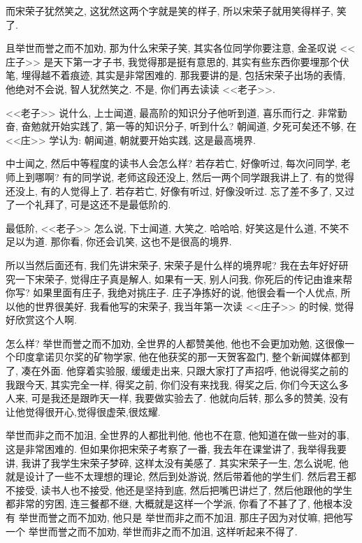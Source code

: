 \documentclass[11pt]{article}
\begin{document}
{\color{blue} 而宋荣子犹然笑之}, 这犹然这两个字就是笑的样子, 所以宋荣子就用笑得样子, 笑了. 


{\color{blue} 且举世而誉之而不加劝}, 那为什么宋荣子笑, 其实各位同学你要注意, 金圣叹说 <<庄子>> 是天下第一才子书, 我觉得那是挺有意思的, 其实有些东西你要埋那个伏笔, 埋得越不着痕迹, 其实是非常困难的. 那我要讲的是, 包括宋荣子出场的表情, 他绝对不会说, 智人犹然笑之. 不是, 你们再去读读 <<老子>>. 

<<老子>> 说什么, 上士闻道, 最高阶的知识分子他听到道, 喜乐而行之. 非常勤奋, 奋勉就开始实践了, 第一等的知识分子, 听到什么? 朝闻道, 夕死可矣还不够, 在 <<庄>> 学认为: 朝闻道, 朝就要开始实践, 这是最高境界. 

中士闻之, 然后中等程度的读书人会怎么样? 若存若亡, 好像听过, 每次问同学, 老师上到哪啊? 有的同学说, 老师这段还没上, 然后一两个同学跟我讲上了. 有的觉得还没上, 有的人觉得上了. 若存若亡, 好像有听过, 好像没听过. 忘了差不多了, 又过了一个礼拜了, 可是这还不是最低阶的.

最低阶, <<老子>> 怎么说, 下士闻道, 大笑之. 哈哈哈, 好笑这是什么道, 不笑不足以为道. 那你看, 你还会讥笑, 这也不是很高的境界.

所以当然后面还有, 我们先讲宋荣子, 宋荣子是什么样的境界呢? 我在去年好好研究一下宋荣子, 觉得庄子真是解人, 如果有一天, 别人问我, 你死后的传记由谁来帮你写? 如果里面有庄子, 我绝对挑庄子. 庄子净拣好的说, 他很会看一个人优点, 所以他的世界很美好. 我看他写的宋荣子, 我当年第一次读 <<庄子>> 的时候, 觉得好欣赏这个人啊. 

怎么样? {\color{blue} 举世而誉之而不加劝}, 全世界的人都赞美他, 他也不会更加劝勉, 这很像一个印度拿诺贝尔奖的矿物学家, 他在他获奖的那一天贺客盈门, 整个新闻媒体都到了, 凑在外面. 他穿着实验服, 缓缓走出来, 只跟大家打了声招呼, 他说得奖之前的我跟今天, 其实完全一样, 得奖之前, 你们没有来找我, 得奖之后, 你们今天这么多人来, 可是我还是跟昨天一样, 我要做实验去了. 他就向后转, 那么多的赞美, 没有让他觉得很开心,觉得很虚荣,很炫耀.

{\color{blue} 举世而非之而不加沮}, 全世界的人都批判他, 他也不在意, 他知道在做一些对的事, 这是非常困难的. 但如果你把宋荣子考察了一番, 我去年在课堂讲了, 我举得我要讲, 我讲了我学生宋荣子梦碎, 这样太没有美感了. 其实宋荣子一生, 怎么说呢, 他就是设计了一些不太理想的理论, 然后到处游说, 然后带着他的学生们. 然后君王都不接受, 读书人也不接受, 他还是坚持到底, 然后把嘴巴讲烂了, 然后他跟他的学生都非常的穷困, 连三餐都不继, 大概就是这样一个学派, 你看了不甚了了, 他根本没有{\color{blue} 举世而誉之而不加劝}, 他只是{\color{blue} 举世而非之而不加沮}. 那庄子因为对仗嘛, 把他写一个 {\color{blue} 举世而誉之而不加劝, 举世而非之而不加沮}, 这样听起来不得了.
\end{document}
